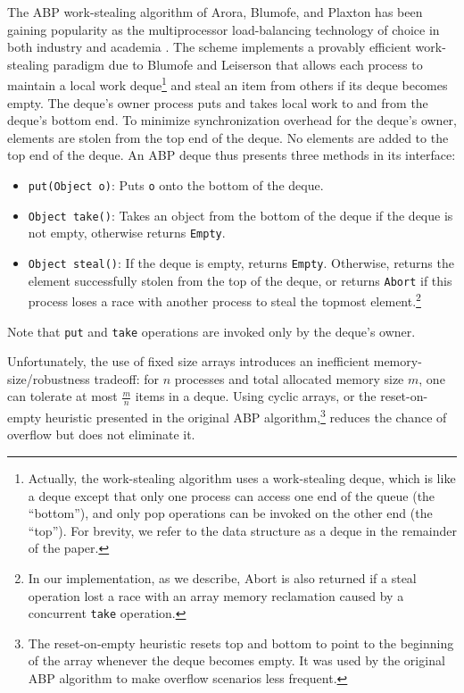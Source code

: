 The ABP work-stealing algorithm of Arora, Blumofe, and Plaxton
\cite{Arora2001} has been gaining popularity as the multiprocessor
load-balancing technology of choice in both industry and academia
\cite{Arora2001, Acar2002, Blumofe1995, Frigo1998, Danaher2005}. The
scheme implements a provably efficient work-stealing paradigm due to
Blumofe and Leiserson \cite{Blumofe1999} that allows each process to
maintain a local work deque\footnote{Actually, the work-stealing
  algorithm uses a work-stealing deque, which is like a deque
  \cite{Knuth1997} except that only one process can access one end of
  the queue (the ``bottom''), and only pop operations can be invoked
  on the other end (the ``top'').  For brevity, we refer to the data
  structure as a deque in the remainder of the paper.} and steal an
item from others if its deque becomes empty. The deque's owner process
puts and takes local work to and from the deque's bottom end. To
minimize synchronization overhead for the deque's owner, elements are
stolen from the top end of the deque. No elements are added to the top
end of the deque. An ABP deque thus presents three methods in its
interface:

\begin{itemize}
\item \lstinline!put(Object o)!: Puts \lstinline!o! onto the bottom
  of the deque.
\item \lstinline!Object take()!: Takes an object from the bottom of the
  deque if the deque is not empty, otherwise returns
  \lstinline!Empty!.
\item \lstinline!Object steal()!: If the deque is empty, returns
  \lstinline!Empty!. Otherwise, returns the element successfully
  stolen from the top of the deque, or returns \lstinline!Abort! if
  this process loses a race with another process to steal the topmost
  element.\footnote{In our implementation, as we describe, Abort is
    also returned if a steal operation lost a race with an array
    memory reclamation caused by a concurrent \lstinline!take!
    operation.}
\end{itemize}

Note that \lstinline!put! and \lstinline!take! operations
are invoked only by the deque's owner.

Unfortunately, the use of fixed size arrays introduces an inefficient
memory-size/robustness tradeoff: for $n$ processes and total allocated
memory size $m$, one can tolerate at most $\frac{m}{n}$ items in a
deque. Using cyclic arrays, or the reset-on- empty heuristic presented
in the original ABP algorithm,\footnote{The reset-on-empty heuristic
  resets top and bottom to point to the beginning of the array
  whenever the deque becomes empty. It was used by the original ABP
  algorithm to make overflow scenarios less frequent.} reduces the
chance of overflow but does not eliminate it.

